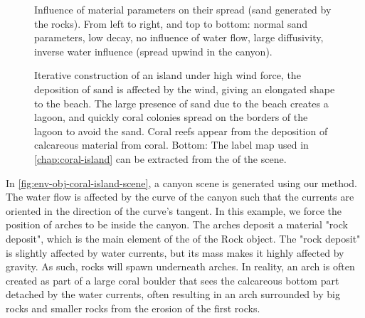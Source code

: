 \begin{figure}
    \caption{Influence of material parameters on their spread (sand generated by the rocks). From left to right, and top to bottom: normal sand parameters, low decay, no influence of water flow, large diffusivity, inverse water influence (spread upwind in the canyon).}
    \label{fig:env-obj-material-diffusion-parameters}
\end{figure}

\begin{figure}
    \caption{Iterative construction of an island under high wind force, the deposition of sand is affected by the wind, giving an elongated shape to the beach. The large presence of sand due to the beach creates a lagoon, and quickly coral colonies spread on the borders of the lagoon to avoid the sand. Coral reefs appear from the deposition of calcareous material from coral. Bottom: The label map used in \cref{chap:coral-island} can be extracted from the  of the scene.}
    \label{fig:env-obj-iterative-island}
\end{figure}

In \cref{fig:env-obj-coral-island-scene}, a canyon scene is generated using our method. The water flow is affected by the curve of the canyon such that the currents are oriented in the direction of the curve's tangent. In this example, we force the position of arches to be inside the canyon. The arches deposit a material "rock deposit", which is the main element of the  of the Rock object. The "rock deposit" is slightly affected by water currents, but its mass makes it highly affected by gravity. As such, rocks will spawn underneath arches. In reality, an arch is often created as part of a large coral boulder that sees the calcareous bottom part detached by the water currents, often resulting in an arch surrounded by big rocks and smaller rocks from the erosion of the first rocks.

